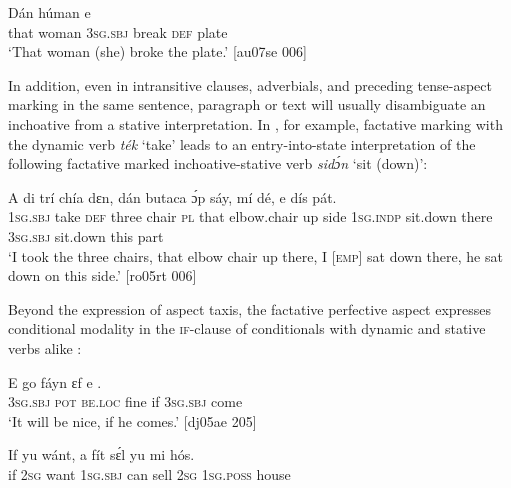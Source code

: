 \ea%
    \label{ex:key:318}
    \gll Dán  húman  e         \\
that  woman  3\textsc{sg.sbj}  break  \textsc{def}   plate\\

\glt ‘That woman (she) broke the plate.’ [au07se 006]
\z

In addition, even in intransitive clauses, adverbials, and preceding tense-aspect marking in the same sentence, paragraph or text will usually disambiguate an inchoative from a stative interpretation. In , for example, factative marking with the dynamic verb \textit{ték} ‘take’ leads to an entry-into-state interpretation of the following factative marked inchoative-stative verb \textit{sidɔ́n} ‘sit (down)’:


\ea%
    \label{ex:key:319}
    \gll \MakeUppercase{A}       di  trí    chía    dɛn,    dán    butaca    ɔ́p  sáy,
mí      dé,    e      dís  pát.\\
\textsc{1sg.sbj}  take    \textsc{def}  three  chair  \textsc{pl}    that    elbow.chair  up  side
\textsc{1sg.indp}  sit.down  there  \textsc{3sg.sbj}  sit.down  this  part\\

\glt ‘I took the three chairs, that elbow chair up there, I \textsc{[emp]} sat down 
there, he sat down on this side.’ [ro05rt 006]
\z

Beyond the expression of aspect taxis, the factative perfective aspect expresses conditional modality in the \textsc{if-}clause of conditionals with dynamic  and stative verbs alike : 


\ea%
    \label{ex:key:320}
    \gll E    go     fáyn    ɛf  e    .\\
\textsc{3sg.sbj}  \textsc{pot}  \textsc{be.loc}  fine    if  \textsc{3sg.sbj}  come\\

\glt ‘It will be nice, if he comes.’ [dj05ae 205]
\z


\ea%
    \label{ex:key:321}
    \gll If  yu  wánt,  a    fít  sɛ́l  yu  mi    hós.\\
if  \textsc{2sg}  want  \textsc{1sg.sbj}  can  sell  \textsc{2sg}  \textsc{1sg.poss}  house\\

